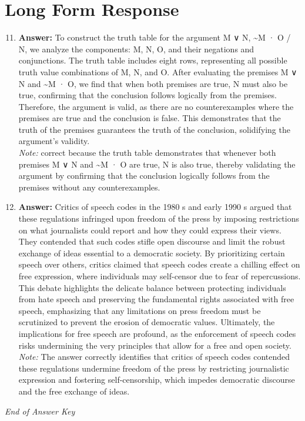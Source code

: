 \documentclass[12pt]{article}
\begin{document}
\section*{Long Form Response}
\begin{enumerate}[label=\arabic*.]
\setcounter{enumi}{10}
\item \textbf{Answer:} To construct the truth table for the argument M ∨ N, \textasciitilde{}M · O / N, we analyze the components: M, N, O, and their negations and conjunctions. The truth table includes eight rows, representing all possible truth value combinations of M, N, and O. After evaluating the premises M ∨ N and \textasciitilde{}M · O, we find that when both premises are true, N must also be true, confirming that the conclusion follows logically from the premises. Therefore, the argument is valid, as there are no counterexamples where the premises are true and the conclusion is false. This demonstrates that the truth of the premises guarantees the truth of the conclusion, solidifying the argument's validity.
\\ \textit{Note:} correct because the truth table demonstrates that whenever both premises M ∨ N and \textasciitilde{}M · O are true, N is also true, thereby validating the argument by confirming that the conclusion logically follows from the premises without any counterexamples.
\item \textbf{Answer:} Critics of speech codes in the 1980 s and early 1990 s argued that these regulations infringed upon freedom of the press by imposing restrictions on what journalists could report and how they could express their views. They contended that such codes stifle open discourse and limit the robust exchange of ideas essential to a democratic society. By prioritizing certain speech over others, critics claimed that speech codes create a chilling effect on free expression, where individuals may self-censor due to fear of repercussions. This debate highlights the delicate balance between protecting individuals from hate speech and preserving the fundamental rights associated with free speech, emphasizing that any limitations on press freedom must be scrutinized to prevent the erosion of democratic values. Ultimately, the implications for free speech are profound, as the enforcement of speech codes risks undermining the very principles that allow for a free and open society.
\\ \textit{Note:} The answer correctly identifies that critics of speech codes contended these regulations undermine freedom of the press by restricting journalistic expression and fostering self-censorship, which impedes democratic discourse and the free exchange of ideas.
\end{enumerate}

\vfill
\noindent\textit{End of Answer Key}
\end{document}
